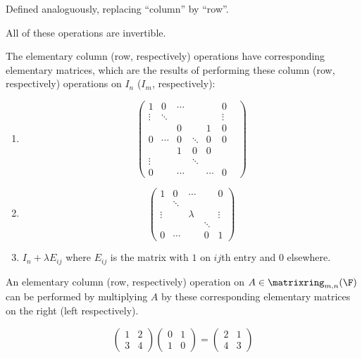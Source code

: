 \documentclass[a4paper]{article}
\newcommand*{\M}{\matrixring}
\theoremstyle{definition}
\begin{document}
\begin{definition}
  Defined analoguously, replacing ``column'' by ``row''.
\end{definition}

\begin{note}
  All of these operations are invertible.
\end{note}

\begin{definition}
The elementary column (row, respectively) operations have corresponding elementary matrices, which are the results of performing these column (row, respectively) operations on \(I_n\) (\(I_m\), respectively):
\begin{enumerate}
\item
  \[
    \begin{pmatrix}
      1 & 0 & \cdots & & & 0 \\
      \vdots & \ddots & & & & \vdots \\
      & & 0 & & 1 & 0 \\
      0 & \cdots & 0 & \ddots & 0 & 0 \\
      & & 1 & 0 & 0 & & \\
      \vdots & & &  \ddots & \\
      0 & & \cdots & & \cdots & 0
    \end{pmatrix}
  \]
\item
  \[
    \begin{pmatrix}
      1 & 0 & \cdots & & 0 \\
       & \ddots & & & \\
      \vdots & & \lambda & & \vdots \\
       & & & \ddots & \\
      0 & \cdots & & 0 & 1
    \end{pmatrix}
  \]
\item \(I_n+\lambda E_{ij}\) where \(E_{ij}\) is the matrix with \(1\) on \(ij\)th entry and \(0\) elsewhere.
\end{enumerate}
\end{definition}

An elementary column (row, respectively) operation on \(A\in \M_{m,n}(\F)\) can be performed by multiplying \(A\) by these corresponding elementary matrices on the right (left respectively).

\begin{eg}
  \[
    \begin{pmatrix}
      1 & 2 \\ 3 & 4
    \end{pmatrix}
    \begin{pmatrix} 0 & 1 \\ 1 & 0 \end{pmatrix} = \begin{pmatrix} 2 & 1 \\ 4 & 3 \end{pmatrix}
  \]
\end{eg}
\end{document}

